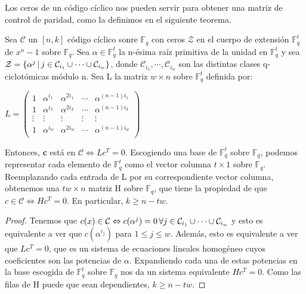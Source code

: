 Los ceros de un código cíclico nos pueden servir para obtener una matriz de control de paridad, como la definimos en el siguiente teorema.

\begin{theorem}
Sea $\mathcal{C}$ un $[n,k]$ código cíclico sonre $\mathbb{F}_q$ con ceros $\mathcal{Z}$ en el cuerpo de extensión $\mathbb{F}_q^t$ de $x^n-1$ sobre $\mathbb{F}_q$. Sea $ \alpha \in \mathbb{F}_q^t$ la n-ésima raíz primitiva de la unidad en $\mathbb{F}_q^t$ y sea $\mathcal{Z} = \{ \alpha^j \thinspace | \thinspace j \in \mathcal{C}_{i_1} \cup \cdots \cup \mathcal{C}_{i_w} \} $, donde $\mathcal{C}_{i_1}, \cdots , \mathcal{C}_{i_w}$ son las distintas clases q-ciclotómicas módulo n. Sea L la matriz $w \times n$ sobre $\mathbb{F}_q^t$ definida por:

$ L = \begin{pmatrix}
			1 & \alpha^{i_1} & \alpha^{2i_1} & \cdots & \alpha^{(n-1)i_1} \\
			1 & \alpha^{i_2} & \alpha^{2i_2} & \cdots  & \alpha^{(n-1)i_2} \\
			\vdots & \vdots & \vdots & \vdots & \vdots  \\
			1 & \alpha^{i_w} & \alpha^{2i_w} & \cdots  & \alpha^{(n-1)i_w} \\
	\end{pmatrix}$
	
	
Entonces, \textbf{c} está en $\mathcal{C} \Leftrightarrow Lc^T = 0$. Escogiendo una base de $\mathbb{F}_q^t$ sobre $\mathbb{F}_q$, podemos representar cada elemento de $\mathbb{F}_q^t$ como el vector columna $t \times 1$ sobre $\mathbb{F}_q$. Reemplazando cada entrada de L por su correspondiente vector columna, obtenemos una $tw \times n$  matriz H sobre $\mathbb{F}_q$, que tiene la propiedad de que  $ c \in \mathcal{C} \Leftrightarrow Hc^T = 0$. En particular, $ k \geq n - tw$.
\end{theorem}

\begin{proof}
Tenemos que $ c(x) \in \mathcal{C} \Leftrightarrow c(\alpha^j) = 0 \thinspace \forall j \in \mathcal{C}_{i_1} \cup \cdots \cup \mathcal{C}_{i_w}$ y esto es equivalente a ver que $c(\alpha^{i_j})$ para $1 \leq j \leq w$. Además, esto es equivalente a ver que $Lc^T = 0$, que es un sistema de ecuaciones lineales homogéneo cuyos coeficientes son las potencias de $\alpha$. Expandiendo cada una de estas potencias en la base escogida de $\mathbb{F}_q^t$ sobre $\mathbb{F}_q$ nos da un sistema equivalente $Hc^T = 0$. Como las filas de H puede que sean dependientes, $k \geq n -tw$.
\end{proof}


